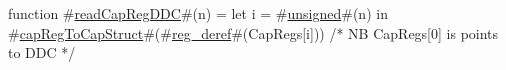 function #\hyperref[zreadCapRegDDC]{readCapRegDDC}#(n) =
  let i = #\hyperref[zunsigned]{unsigned}#(n) in
  #\hyperref[zcapRegToCapStruct]{capRegToCapStruct}#(#\hyperref[zregzyderef]{reg\_deref}#(CapRegs[i])) /* NB CapRegs[0] is points to DDC */
